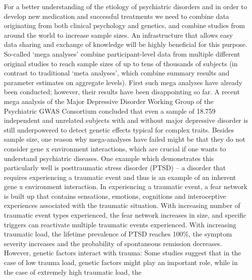 \documentclass[a4paper,USenglish]{dagrep}
\begin{document}
{}
\license
For a better understanding of the etiology of psychiatric disorders and in order
to develop new medication and successful treatments we need to combine data
originating from both clinical psychology and genetics, and combine studies from
around the world to increase sample sizes. An infrastructure that allows easy
data sharing and exchange of knowledge will be highly beneficial for this purpose. 
So-called `mega analyses' combine participant-level data from multiple different
original studies to reach sample sizes of up to tens of thousands of subjects
(in contrast to traditional `meta analyses', which combine summary results and
parameter estimates on aggregate levels). First such mega analyses have already
been conducted; however, their results have been disappointing so far. A recent
mega analysis of the Major Depressive Disorder Working Group of the Psychiatric
GWAS Consortium concluded that even a sample of 18.759 independent and unrelated
subjects with and without major depressive disorder is still underpowered to
detect genetic effects typical for complex traits. 
Besides sample size, one reason why mega-analyses have failed might be that they
do not consider gene x environment interactions, which are crucial if one wants
to understand psychiatric diseases. One example which demonstrates this
particularly well is posttraumatic stress disorder (PTSD) – a disorder that
requires experiencing a traumatic event and thus is an example of an inherent
gene x environment interaction. In experiencing a traumatic event, a fear
network is built up that contains sensations, emotions, cognitions and
interoceptive experiences associated with the traumatic situation. With
increasing number of traumatic event types experienced, the fear network
increases in size, and specific triggers can reactivate multiple traumatic
events experienced. With increasing traumatic load, the lifetime prevalence of
PTSD reaches 100\%, the symptom severity increases and the probability of
spontaneous remission decreases. However, genetic factors interact with trauma:
Some studies suggest that in the case of low trauma load, genetic factors might
play an important role, while in the case of extremely high traumatic load, the
\end{document}
